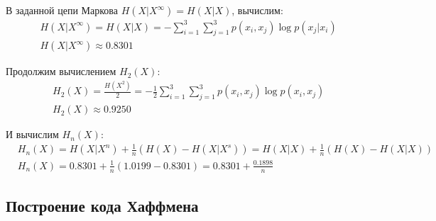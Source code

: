В заданной цепи Маркова $H(X|X^\infty) = H(X|X)$, вычислим:
\begin{equation}
    \begin{split}
        &H(X|X^\infty)=H(X|X)=-\sum\limits_{i=1}^3\sum\limits_{j=1}^3{p(x_i, x_j)\log{p(x_j|x_i)}} \\
        &H(X|X^\infty) \approx 0.8301
    \end{split}
\end{equation}

Продолжим вычислением $H_2(X)$:
\begin{equation}
    \begin{split}
        &H_2(X)=\frac{H(X^2)}2 = -\frac12 \sum\limits_{i=1}^3\sum\limits_{j=1}^3{p(x_i, x_j) \log{p(x_i, x_j)}} \\
        &H_2(X) \approx 0.9250
    \end{split}
\end{equation}

И вычислим $H_n(X)$:
\begin{equation}
    \begin{split}
        &H_n(X)=H(X|X^n)+\frac1n(H(X)-H(X|X^s))=H(X|X)+\frac1n(H(X)-H(X|X)) \\
        &H_n(X)=0.8301+\frac1n(1.0199-0.8301)=0.8301+\frac{0.1898}n
    \end{split}
\end{equation}

\subsection{Построение кода Хаффмена}
